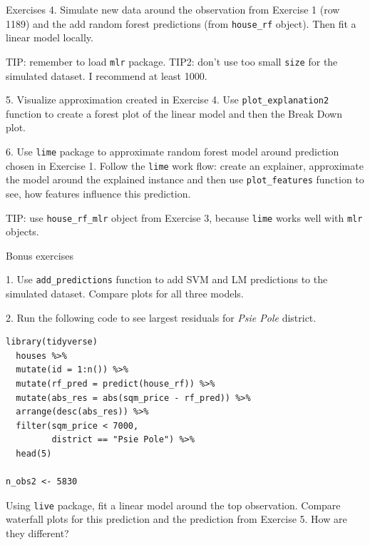 \documentclass[xcolor={dvipsnames}]{beamer}
\begin{document}
\begin{frame}[fragile]{Exercises}
4. Simulate new data around the observation from Exercise 1 (row 1189) and the add random forest predictions (from \texttt{house\_rf} object). Then fit a linear model locally.
	
TIP: remember to load \texttt{mlr} package.
TIP2: don't use too small \texttt{size} for the simulated dataset. I recommend at least 1000.
	
5. Visualize approximation created in Exercise 4.
Use \texttt{plot\_explanation2} function to create a forest plot of the linear model and then the Break Down plot. 

6. Use \texttt{lime} package to approximate random forest model around prediction chosen in  Exercise 1.
Follow the \texttt{lime} work flow: create an explainer, approximate the model around the explained instance and then use \texttt{plot\_features} function to see, how features influence this prediction.

TIP: use \texttt{house\_rf\_mlr} object from Exercise 3, because \texttt{lime} works well with \texttt{mlr} objects.

\end{frame}

\begin{frame}[fragile]{Bonus exercises}

1. Use \texttt{add\_predictions} function to add SVM and LM predictions to the simulated dataset. Compare plots for all three models.
	
2. Run the following code to see largest residuals for \textit{Psie Pole} district.
\begin{lstlisting}
library(tidyverse)
  houses %>%
  mutate(id = 1:n()) %>%
  mutate(rf_pred = predict(house_rf)) %>%
  mutate(abs_res = abs(sqm_price - rf_pred)) %>%
  arrange(desc(abs_res)) %>%
  filter(sqm_price < 7000,
         district == "Psie Pole") %>%
  head(5)

n_obs2 <- 5830
\end{lstlisting}
Using \texttt{live} package, fit a linear model around the top observation.
Compare waterfall plots for this prediction and the prediction from Exercise 5.
How are they different?

\end{frame}

%		
%		
	
\end{document}
